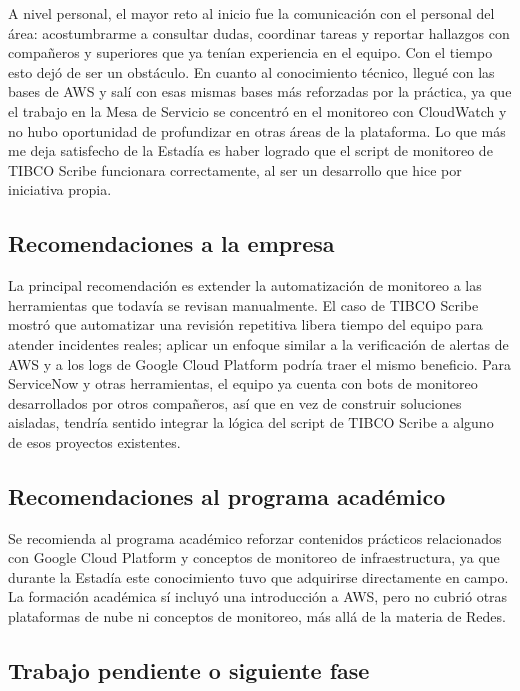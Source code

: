 A nivel personal, el mayor reto al inicio fue la comunicación con el personal del área: acostumbrarme a consultar dudas, coordinar tareas y reportar hallazgos con compañeros y superiores que ya tenían experiencia en el equipo. Con el tiempo esto dejó de ser un obstáculo. En cuanto al conocimiento técnico, llegué con las bases de AWS y salí con esas mismas bases más reforzadas por la práctica, ya que el trabajo en la Mesa de Servicio se concentró en el monitoreo con CloudWatch y no hubo oportunidad de profundizar en otras áreas de la plataforma. Lo que más me deja satisfecho de la Estadía es haber logrado que el script de monitoreo de TIBCO Scribe funcionara correctamente, al ser un desarrollo que hice por iniciativa propia.

\subsection{Recomendaciones a la empresa}
\label{sec:recomendaciones}

La principal recomendación es extender la automatización de monitoreo a las herramientas que todavía se revisan manualmente. El caso de TIBCO Scribe mostró que automatizar una revisión repetitiva libera tiempo del equipo para atender incidentes reales; aplicar un enfoque similar a la verificación de alertas de AWS y a los logs de Google Cloud Platform podría traer el mismo beneficio. Para ServiceNow y otras herramientas, el equipo ya cuenta con bots de monitoreo desarrollados por otros compañeros, así que en vez de construir soluciones aisladas, tendría sentido integrar la lógica del script de TIBCO Scribe a alguno de esos proyectos existentes.

\subsection{Recomendaciones al programa académico}
\label{sec:recomendaciones_programa}

Se recomienda al programa académico reforzar contenidos prácticos relacionados con Google Cloud Platform y conceptos de monitoreo de infraestructura, ya que durante la Estadía este conocimiento tuvo que adquirirse directamente en campo. La formación académica sí incluyó una introducción a AWS, pero no cubrió otras plataformas de nube ni conceptos de monitoreo, más allá de la materia de Redes.

\subsection{Trabajo pendiente o siguiente fase}
\label{sec:trabajo_pendiente}

